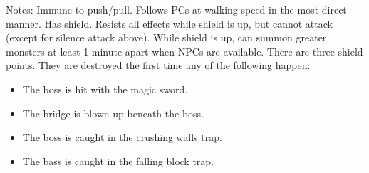 \documentclass[green]{grimrock}
\begin{document}
Notes: Immune to push/pull. Follows PCs at walking speed in the most direct manner. Has shield. Resists all effects while shield is up, but cannot attack (except for silence attack above). While shield is up, can summon greater monsters at least 1 minute apart when NPCs are available. There are three shield points. They are destroyed the first time any of the following happen:
\begin{itemize}
\item The boss is hit with the magic sword.
\item The bridge is blown up beneath the boss.
\item The boss is caught in the crushing walls trap.
\item The bass is caught in the falling block trap.
\end{itemize}
\end{document}
